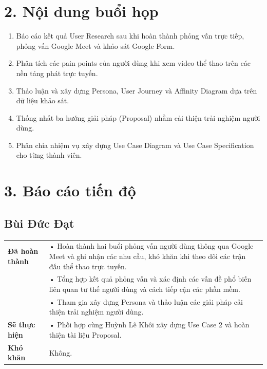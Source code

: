 \documentclass[11pt,a4paper]{article}
\begin{document}
\vspace{0.8cm}


\section*{2. Nội dung buổi họp}

\begin{enumerate}
    \item Báo cáo kết quả User Research sau khi hoàn thành phỏng vấn trực tiếp, phỏng vấn Google Meet và khảo sát Google Form.

    \item Phân tích các pain points của người dùng khi xem video thể thao trên các nền tảng phát trực tuyến.

    \item Thảo luận và xây dựng Persona, User Journey và Affinity Diagram dựa trên dữ liệu khảo sát.

    \item Thống nhất ba hướng giải pháp (Proposal) nhằm cải thiện trải nghiệm người dùng.

    \item Phân chia nhiệm vụ xây dựng Use Case Diagram và Use Case Specification cho từng thành viên.
\end{enumerate}


\section*{3. Báo cáo tiến độ}


\subsection*{Bùi Đức Đạt}

\begin{tabularx}{\textwidth}{|p{4cm}|X|}
\hline
\textbf{Đã hoàn thành} &
• Hoàn thành hai buổi phỏng vấn người dùng thông qua Google Meet và ghi nhận các nhu cầu, khó khăn khi theo dõi các trận đấu thể thao trực tuyến.\\
&
• Tổng hợp kết quả phỏng vấn và xác định các vấn đề phổ biến liên quan tư thế người dùng và cách tiếp cận các phần mềm.\\
&
• Tham gia xây dựng Persona và thảo luận các giải pháp cải thiện trải nghiệm người dùng.\\
\hline

\textbf{Sẽ thực hiện} &
• Phối hợp cùng Huỳnh Lê Khôi xây dựng Use Case 2 và hoàn thiện tài liệu Proposal.\\
\hline

\textbf{Khó khăn} &
Không.\\
\hline
\end{tabularx}
\end{document}
